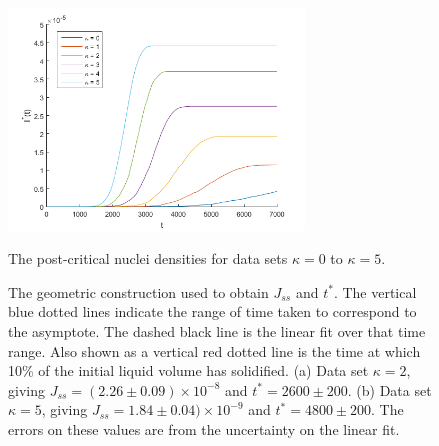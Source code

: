 \begin{figure}[!h]
		\centering
	\includegraphics[width=0.7\textwidth]{fig_res/res_I_datasets_newnoise}
	\caption{The post-critical nuclei densities for data sets $\kappa=0$ to $\kappa=5$.}\label{fig:res_I_datasets_newnoise}
	\centering
	\caption{The geometric construction used to obtain $J_{ss}$ and $t^*$. The vertical blue dotted lines indicate the range of time taken to correspond to the asymptote. The dashed black line is the linear fit over that time range. Also shown as a vertical red dotted line is the time at which 10\% of the initial liquid volume has solidified. (a) Data set $\kappa=2$, giving $J_{ss}=(2.26\pm 0.09)\times10^{-8}$ and $t^*=2600\pm 200$. (b) Data set $\kappa=5$, giving $J_{ss}=1.84\pm 0.04)\times10^{-9}$ and $t^*=4800\pm 200$. The errors on these values are from the uncertainty on the linear fit.}\label{fig:res_I_datasets_examples_newnoise}
\end{figure}


